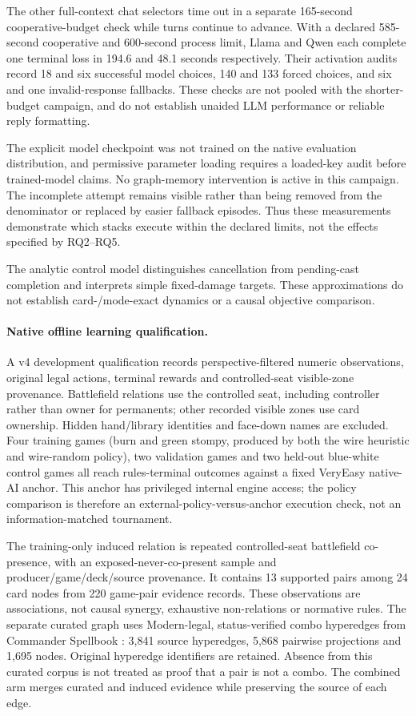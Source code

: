 \documentclass[11pt,a4paper]{article}
\theoremstyle{definition}
\theoremstyle{plain}
\begin{document}
The other full-context chat selectors time out in a separate 165-second
cooperative-budget check while turns continue to advance. With a declared
585-second cooperative and 600-second process limit, Llama and Qwen each
complete one terminal loss in 194.6 and 48.1 seconds respectively. Their
activation audits record 18 and six successful model choices, 140 and 133
forced choices, and six and one invalid-response fallbacks. These checks
are not pooled with the shorter-budget campaign, and do not establish
unaided LLM performance or reliable reply formatting.

The explicit model checkpoint was not trained on the native evaluation
distribution, and permissive parameter loading requires a loaded-key audit
before trained-model claims. No graph-memory intervention is active in this
campaign. The incomplete attempt remains visible rather than being removed
from the denominator or replaced by easier fallback episodes. Thus these
measurements demonstrate which stacks execute within the declared limits,
not the effects specified by RQ2--RQ5.

The analytic control model distinguishes cancellation from pending-cast
completion and interprets simple fixed-damage targets. These approximations
do not establish card-/mode-exact dynamics or a causal objective comparison.

\paragraph{Native offline learning qualification.}
A v4 development qualification records perspective-filtered numeric
observations, original legal actions, terminal rewards and controlled-seat
visible-zone provenance. Battlefield relations use the controlled seat,
including controller rather than owner for permanents; other recorded visible
zones use card ownership. Hidden hand/library identities and face-down names
are excluded. Four training games (burn and green stompy, produced by both the
wire heuristic and wire-random policy), two validation games and two held-out
blue-white control games all reach rules-terminal outcomes against a fixed
VeryEasy native-AI anchor. This anchor has privileged internal engine access;
the policy comparison is therefore an external-policy-versus-anchor execution
check, not an information-matched tournament.

The training-only induced relation is repeated controlled-seat battlefield
co-presence, with an exposed-never-co-present sample and
producer/game/deck/source provenance. It contains 13 supported pairs among 24
card nodes from 220 game-pair evidence records. These observations are
associations, not causal synergy, exhaustive non-relations or normative rules.
The separate curated graph uses Modern-legal, status-verified combo
hyperedges from Commander Spellbook \citep{commander_spellbook}: 3,841 source
hyperedges, 5,868 pairwise projections and 1,695 nodes. Original hyperedge
identifiers are retained. Absence from this curated corpus is not treated as
proof that a pair is not a combo. The combined arm merges curated and induced
evidence while preserving the source of each edge.
\end{document}
